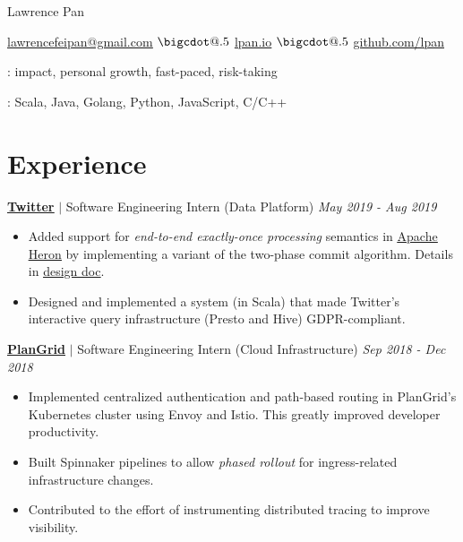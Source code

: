 \documentclass[paper=a4,fontsize=15pt]{scrartcl}
\makeatletter
\newcommand*\bigcdot{\mathpalette\bigcdot@{.5}}
\newcommand*\bigcdot@[2]{\mathbin{\vcenter{\hbox{\scalebox{#2}{$\m@th#1\bullet$}}}}}
\newcommand{\smolboispace}{\vspace*{0.1em}}
\newcommand{\halfspace}{\vspace*{0.5em}}
\newcommand{\bighalfspace}{\vspace*{0.75em}}
\newcommand{\http}[1]{\href{http://#1}{\ul{#1}}}
\newcommand{\https}[1]{\href{https://#1}{\ul{#1}}}
\newcommand{\email}[1]{\href{mailto:#1}{\ul{#1}}}
\newcommand*{\newsummary}[2]{
  \noindent\hangafter=0\small
  {\capitalisewords{\textbf{#1}}: #2 \par}
}
\makeatother
\begin{document}
\begin{center}
  {\fontsize{35}{40}\selectfont Lawrence Pan \par}
  \halfspace

  {\normalsize
    \email{lawrencefeipan@gmail.com}
    $\bigcdot$ \http{lpan.io}
    $\bigcdot$ \https{github.com/lpan}
    \par}
\end{center}

\newsummary{values}{impact, personal growth, fast-paced, risk-taking}
\smolboispace
\newsummary{languages}{Scala, Java, Golang, Python, JavaScript, C/C++}

\section*{Experience}{}
\normalsize
\noindent \href{https://twitter.com}{\textbf{\ul{Twitter}}}
$\vert$ \small Software Engineering Intern (Data Platform)
{\hfill \footnotesize \textit{May 2019 - Aug 2019}}
\begin{itemize}[noitemsep,leftmargin=20pt,label=\raisebox{0.25ex}{\tiny$\bullet$},topsep=5pt]
  \small
  \item Added support for \textit{end-to-end exactly-once processing} semantics
    in \href{https://apache.github.io/incubator-heron/}{\ul{Apache Heron}} by
    implementing a variant of the two-phase commit algorithm. Details in
    \href{https://docs.google.com/document/d/1Shqp2z-uAhsOUN2erbc2d-72wdjA8anp}{\ul{design
        doc}}.
  \item Designed and implemented a system (in Scala) that made Twitter's
    interactive query infrastructure (Presto and Hive) GDPR-compliant.
\end{itemize}

\bighalfspace
\normalsize
\noindent \href{https://plangrid.com}{\textbf{\ul{PlanGrid}}}
$\vert$ \small Software Engineering Intern (Cloud Infrastructure)
{\hfill \footnotesize \textit{Sep 2018 - Dec 2018}}
\begin{itemize}[noitemsep,leftmargin=20pt,label=\raisebox{0.25ex}{\tiny$\bullet$},topsep=5pt]
  \small
  \item Implemented centralized authentication and path-based routing in
    PlanGrid's Kubernetes cluster using Envoy and Istio. This greatly improved
    developer productivity.
  \item Built Spinnaker pipelines to allow \textit{phased rollout} for
    ingress-related infrastructure changes.
  \item Contributed to the effort of instrumenting distributed tracing to
    improve visibility.
\end{itemize}
\end{document}
